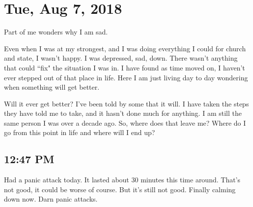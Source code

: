 \section{Tue, Aug 7, 2018}

\centerline{Part of me wonders why I am sad.}

Even when I was at my strongest, and I was doing everything I could for church and
state, I wasn't happy. I was depressed, sad, down. There wasn't anything that could
``fix" the situation I was in. I have found as time moved on, I haven't ever stepped
out of that place in life. Here I am just living day to day wondering when something
will get better.

Will it ever get better? I've been told by some that it will. I have taken the steps
they have told me to take, and it hasn't done much for anything. I am still the same
person I was over a decade ago. So, where does that leave me? Where do I go from this
point in life and where will I end up?

\subsection{12:47 PM}

Had a panic attack today. It lasted about 30 minutes this time around. That's not
good, it could be worse of course. But it's still not good. Finally calming down now.
Darn panic attacks.
